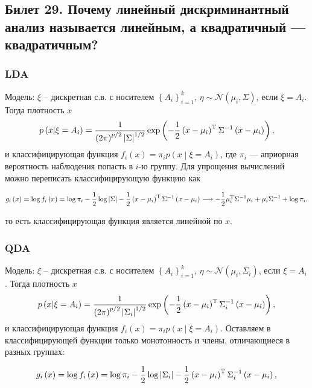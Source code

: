 \subsection{Билет 29. Почему линейный дискриминантный анализ называется линейным, а квадратичный --- квадратичным?}
	\subsubsection{LDA} %
	\label{ssub:lda}
		Модель: $\xi$ -- дискретная с.в. с носителем $\left\lbrace A_i\right\rbrace_{i=1}^k$, $\eta \sim \mathcal N\left(\mu_i, \Sigma\right)$, если $\xi = A_i$. Тогда плотность $x$
		$$p\left(x\middle\vert \xi = A_i\right) = \frac{1}{\left(2\pi\right)^{p/2}\left\vert\Sigma\right\vert^{1/2}} \exp\left(-\frac{1}{2}\left(x - \mu_i\right)^{\mathrm{T}}\Sigma^{-1}\left(x - \mu_i\right)\right),$$
		и классифицирующая функция $f_i\left(x\right) = \pi_i p\left(x\middle\vert \xi = A_i\right)$, где $\pi_i$ --- априорная вероятность наблюдения попасть в $i$-ю группу. Для упрощения вычислений можно переписать классифицирующую функцию как

		$$g_i\left(x\right) = \log f_i\left(x\right) = \log \pi_i - \frac{1}{2}\log\left\vert\Sigma\right\vert -  \frac{1}{2}\left(x - \mu_i\right)^{\mathrm{T}}\Sigma^{-1}\left(x - \mu_i\right) \longrightarrow -  \frac{1}{2}\mu_i^{\mathrm{T}}\Sigma^{-1}\mu_i + \mu_i\Sigma^{-1} + \log\pi_i,$$

		то есть классифицирующая функция является линейной по $x$.


	\subsubsection{QDA} %
	\label{ssub:qda}

	Модель: $\xi$ -- дискретная с.в. с носителем $\left\lbrace A_i\right\rbrace_{i=1}^k$, $\eta \sim \mathcal N\left(\mu_i, \Sigma_i\right)$, если $\xi = A_i$. Тогда плотность $x$
		$$p\left(x\middle\vert \xi = A_i\right) = \frac{1}{\left(2\pi\right)^{p/2}\left\vert\Sigma_i\right\vert^{1/2}} \exp\left(-\frac{1}{2}\left(x - \mu_i\right)^{\mathrm{T}}\Sigma_i^{-1}\left(x - \mu_i\right)\right),$$
		и классифицирующая функция $f_i\left(x\right) = \pi_i p\left(x\middle\vert \xi = A_i\right)$. Оставляем в классифицирующей функции только монотонность и члены, отличающиеся в разных группах:

		$$g_i\left(x\right) = \log f_i\left(x\right) = \log \pi_i - \frac{1}{2}\log\left\vert\Sigma_i\right\vert -  \frac{1}{2}\left(x - \mu_i\right)^{\mathrm{T}}\Sigma_i^{-1}\left(x - \mu_i\right),$$

